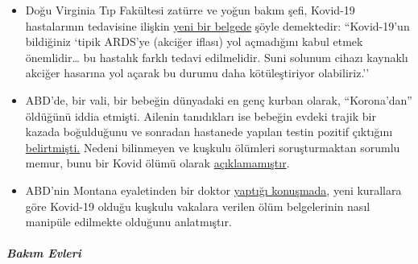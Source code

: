 \begin{itemize}
{  varılmıştır}. Halbuki, hastalığın daha kolay bulaşması yüzünden,
  örneğin New York'taki vakalar,
  \href{https://archive.is/7w2XE}{normalden daha kısa sürede} ortaya
  çıkmıştır.
\item
  Doğu Virginia Tıp Fakültesi zatürre ve yoğun bakım şefi, Kovid-19
  hastalarının tedavisine ilişkin
  \href{https://www.evms.edu/media/evms_public/departments/internal_medicine/EVMS_Critical_Care_COVID-19_Protocol.pdf}{yeni
  bir belgede} şöyle demektedir: ``Kovid-19'un bildiğiniz `tipik ARDS'ye
  (akciğer iflası) yol açmadığını kabul etmek önemlidir\ldots{} bu
  hastalık farklı tedavi edilmelidir. Suni solunum cihazı kaynaklı
  akciğer hasarına yol açarak bu durumu daha kötüleştiriyor
  olabiliriz.''
\item
  ABD'de, bir vali, bir bebeğin dünyadaki en genç kurban olarak,
  ``Korona'dan'' öldüğünü iddia etmişti. Ailenin tanıdıkları ise bebeğin
  evdeki trajik bir kazada boğulduğunu ve sonradan hastanede yapılan
  testin pozitif çıktığını
  \href{https://www.washingtonexaminer.com/news/candace-owens-accuses-connecticut-governor-of-lying-about-coronavirus-death-calls-for-resignation}{belirtmişti.}
  Nedeni bilinmeyen ve kuşkulu ölümleri soruşturmaktan sorumlu memur,
  bunu bir Kovid ölümü olarak
  \href{https://www.dailymail.co.uk/news/article-8193487/Coroner-refuses-rule-COVID-19-cause-death-six-week-old-Connecticut-baby.html}{açıklamamıştır}.
\item
  ABD'nin Montana eyaletinden bir doktor
  \href{https://www.youtube.com/watch?v=V0lIWZpiRU0}{yaptığı konuşmada},
  yeni kurallara göre Kovid-19 olduğu kuşkulu vakalara verilen ölüm
  belgelerinin nasıl manipüle edilmekte olduğunu anlatmıştır.
\end{itemize}

\hypertarget{bakux131m-evleri}{%
\subparagraph{\texorpdfstring{\textbf{Bakım
Evleri}}{Bakım Evleri}}\label{bakux131m-evleri}}

